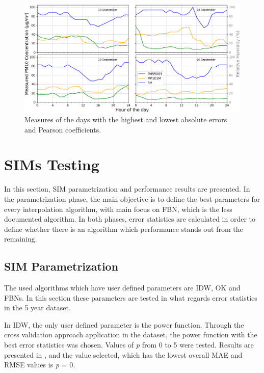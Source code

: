 \begin{figure}[ht]
\centering
\includegraphics[width=1\textwidth]{./Images/Results/worst-and-best.png}
\caption{Measures of the days with the highest and lowest absolute errors and Pearson coefficients.}
\label{fig:worst-and-best}
\end{figure}

\pagebreak
%
\section{SIMs Testing}

In this section, SIM parametrization and performance results are presented. In the parametrization phase, the main objective is to define the best parameters for every interpolation algorithm, with main focus on FBN, which is the less documented algorithm. In both phases, error statistics are calculated in order to define whether there is an algorithm which performance stands out from the remaining.

\subsection{SIM Parametrization}

The used algorithms which have user defined parameters are IDW, OK and FBNs. In this section these parameters are tested in what regards error statistics in the 5 year dataset.

In IDW, the only user defined parameter is the power function. Through the cross validation approach application in the dataset, the power function with the best error statistics was chosen. Values of \textit{p} from 0 to 5 were tested. Results are presented in , and the value selected, which has the lowest overall MAE and RMSE values is \textit{p} = 0. 

